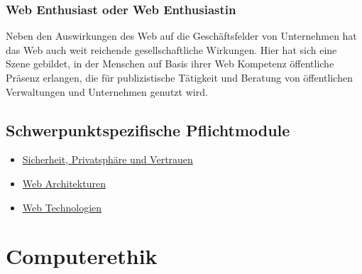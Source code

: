 \subsection*{Web Enthusiast oder Web
Enthusiastin\label{/mi-2017/modulbeschreibungen-master/schwerpunkt-weaving-the-web}}\label{web-enthusiast-oder-web-enthusiastinpathlabelmi-2017modulbeschreibungen-masterschwerpunkt-weaving-the-web}

Neben den Auswirkungen des Web auf die Geschäftsfelder von Unternehmen
hat das Web auch weit reichende gesellschaftliche Wirkungen. Hier hat
sich eine Szene gebildet, in der Menschen auf Basis ihrer Web Kompetenz
öffentliche Präsenz erlangen, die für publizistische Tätigkeit und
Beratung von öffentlichen Verwaltungen und Unternehmen genutzt wird.

\section*{Schwerpunktspezifische
Pflichtmodule\label{/mi-2017/modulbeschreibungen-master/schwerpunkt-weaving-the-web}}\label{schwerpunktspezifische-pflichtmodulepathlabelmi-2017modulbeschreibungen-masterschwerpunkt-weaving-the-web}

\begin{itemize}
\tightlist
\item
  \hyperref[/mi-2017/modulbeschreibungen-master/MA_WTW_Modul_IT-Sicherheit]{Sicherheit,
  Privatsphäre und Vertrauen}
\item
  \hyperref[/mi-2017/modulbeschreibungen-master/MA_WTW_Modul_Web-Architekturen]{Web
  Architekturen}
\item
  \hyperref[/mi-2017/modulbeschreibungen-master/MA_WTW_Modul_Web-Technologien]{Web
  Technologien}
\end{itemize}

\chapter{Computerethik\label{/mi-2017/modulbeschreibungen-master/MA_All_Computerethik}}\label{computerethikpathlabelmi-2017modulbeschreibungen-mastermaux5fallux5fcomputerethik}

